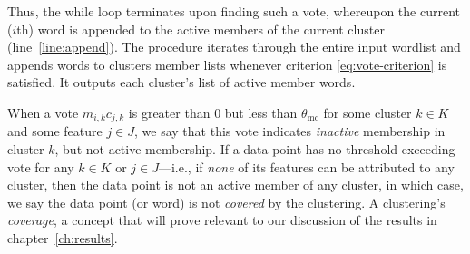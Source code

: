 %
 
 Thus, the while loop terminates upon finding 
 such a vote, whereupon
the current ($i$th) word is appended to the active members of the current cluster (line~\ref{line:append}). 
The procedure iterates through the entire input wordlist and appends words to clusters member lists 
whenever criterion \eqref{eq:vote-criterion} is satisfied. It outputs each cluster's list of active member words.
 
 When a vote $m_{i,k}c_{j,k}$ is greater than $0$ but less than $\theta_{\text{mc}}$ for some cluster $k \in K$ and some feature $j \in J$, we say that this vote indicates \emph{inactive} membership in cluster $k$, but not active membership. 
If a data point has no threshold-exceeding vote for any $k \in K$ or $j \in J$---i.e., if \emph{none} of its features can be attributed
to any cluster, then the data point is not an active member of any cluster, in which case, we say the data point (or word) is not \emph{covered} by the clustering. A clustering's \emph{coverage}, a concept that will prove relevant to our discussion of the results in chapter~\ref{ch:results}.
 

